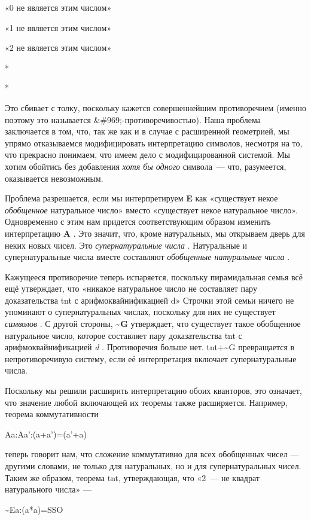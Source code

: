 \documentclass[../main.tex]{subfiles}
\begin{document}
«0 не является этим числом»

«1 не является этим числом»

«2 не является этим числом»

*

*

Это сбивает с толку, поскольку кажется совершеннейшим противоречием (именно поэтому это называется \&\#969;-противоречивостью). Наша проблема заключается в том, что, так же как и в случае с расширенной геометрией, мы упрямо отказываемся модифицировать интерпретацию символов, несмотря на то, что прекрасно понимаем, что имеем дело с модифицированной системой. Мы хотим обойтись без добавления \emph{хотя бы одного} символа~--- что, разумеется, оказывается невозможным.

Проблема разрешается, если мы интерпретируем \textbf{E} как «существует некое \emph{обобщенное} натуральное число» вместо «существует некое натуральное число». Одновременно с этим нам придется соответствующим образом изменить интерпретацию \textbf{A} . Это значит, что, кроме натуральных, мы открываем дверь для неких новых чисел. Это \emph{супернатуральные числа} . Натуральные и супернатуральные числа вместе составляют \emph{обобщенные натуральные числа} .

Кажущееся противоречие теперь испаряется, поскольку пирамидальная семья всё ещё утверждает, что «никакое натуральное число не составляет пару доказательства \acs{tnt} с арифмоквайнификацией d» Строчки этой семьи ничего не упоминают о супернатуральных числах, поскольку для них не существует \emph{символов} . С другой стороны, \textbf{\textasciitilde G} утверждает, что существует такое обобщенное натуральное число, которое составляет пару доказательства \acs{tnt} с арифмоквайнификацией \emph{d} . Противоречия больше нет. \acs{tnt}+\textasciitilde G превращается в непротиворечивую систему, если её интерпретация включает супернатуральные числа.

Поскольку мы решили расширить интерпретацию обоих кванторов, это означает, что значение любой включающей их теоремы также расширяется. Например, теорема коммутативности

Aa:Aa':(a+a')=(a'+a)

теперь говорит нам, что сложение коммутативно для всех обобщенных чисел --- другими словами, не только для натуральных, но и для супернатуральных чисел. Таким же образом, теорема \acs{tnt}, утверждающая, что «2~--- не квадрат натурального числа» ---

\textasciitilde Ea:(a*a)=SSO
\end{document}

